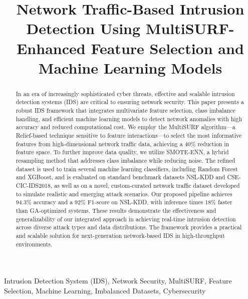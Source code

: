 \documentclass[conference]{IEEEtran}
\begin{document}
\title{Network Traffic-Based Intrusion Detection Using MultiSURF-Enhanced Feature Selection and Machine Learning Models}

\author{
}

\maketitle

\begin{abstract}
In an era of increasingly sophisticated cyber threats, effective and scalable intrusion detection systems (IDS) are critical to ensuring network security. This paper presents a robust IDS framework that integrates multivariate feature selection, class imbalance handling, and efficient machine learning models to detect network anomalies with high accuracy and reduced computational cost. We employ the MultiSURF algorithm—a Relief-based technique sensitive to feature interactions—to select the most informative features from high-dimensional network traffic data, achieving a 40\% reduction in feature space. To further improve data quality, we utilize SMOTE-ENN, a hybrid resampling method that addresses class imbalance while reducing noise. The refined dataset is used to train several machine learning classifiers, including Random Forest and XGBoost, and is evaluated on standard benchmark datasets NSL-KDD and CSE-CIC-IDS2018, as well as on a novel, custom-curated network traffic dataset developed to simulate realistic and emerging attack scenarios. Our proposed pipeline achieves 94.3\% accuracy and a 92\% F1-score on NSL-KDD, with inference times 18\% faster than GA-optimized systems. These results demonstrate the effectiveness and generalizability of our integrated approach in achieving real-time intrusion detection across diverse attack types and data distributions. The framework provides a practical and scalable solution for next-generation network-based IDS in high-throughput environments.
\end{abstract}






\begin{IEEEkeywords}
Intrusion Detection System (IDS), Network Security, MultiSURF, Feature Selection, Machine Learning, Imbalanced Datasets, Cybersecurity
\end{IEEEkeywords}
\end{document}
